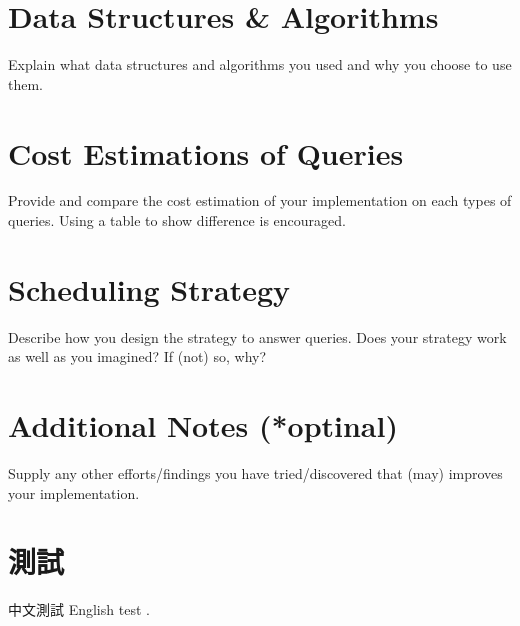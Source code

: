 \documentclass{article}
\begin{document}
\section{Data Structures \& Algorithms}
Explain what data structures and algorithms you used and why you choose to use them.

\section{Cost Estimations of Queries}
Provide and compare the cost estimation of your implementation on each types of queries. Using a table to show difference is encouraged.

\section{Scheduling Strategy}
Describe how you design the strategy to answer queries. Does your strategy work as well as you imagined? If (not) so, why?

\section{Additional Notes (*optinal)}
Supply any other efforts/findings you have tried/discovered that (may) improves your implementation.


\section{測試}
中文測試 English test \cite{mobility2020}.


\end{document}
